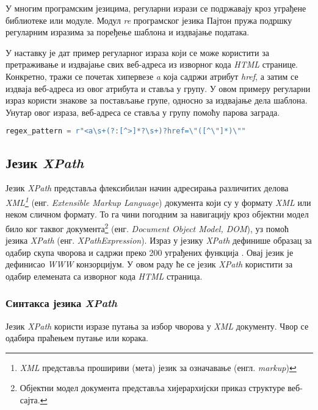\documentclass[12pt,oneside]{memoir}
\begin{document}
У многим програмским језицима, регуларни изрази се подржавају кроз уграђене библиотеке или модуле. Модул \textit{re} програмског језика Пајтон пружа подршку регуларним изразима за поређење шаблона и издвајање података.

У наставку је дат пример регуларног израза који се може користити за претраживање и издвајање свих веб-адреса из изворног кода \textit{HTML} странице. 
Конкретно, тражи се почетак хипервезе \textit{a} која садржи атрибут \textit{href}, а затим се издваја веб-адреса из овог атрибута и ставља у групу. У овом примеру регуларни израз користи знакове за постављање групе, односно за издвајање дела шаблона. Унутар овог израза, веб-адреса се ставља у групу помоћу парова заграда.
\begin{lstlisting}[language=Python]
regex_pattern = r"<a\s+(?:[^>]*?\s+)?href=\"([^\"]*)\""
\end{lstlisting}

\subsection{Језик \textit{XPath}}
Језик \textit{XPath} представља флексибилан начин адресирања различитих делова
\textit{XML\footnote{\textit{XML} представља прошириви (мета) језик за означавање (енгл. \textit{markup})}} (енг. \textit{Extensible Markup Language}) документа који су у формату \textit{XML} или неком сличном формату. То га чини погодним за навигацију кроз објектни модел било ког таквог документа\footnote{Објектни модел документа представља хијерархијски приказ структуре веб-сајта.} (енг. \textit{Document Object Model, DOM}), уз помоћ језика \textit{XPath} (енг. \textit{XPathExpression}). Израз у језику \textit{XPath} дефинише образац за одабир скупа чворова и садржи преко 200 уграђених функција \cite{xpath}. Овај језик је дефинисао \textit{WWW} конзорцијум. У овом раду ће се језик \textit{XPath} користити за одабир елемената са изворног кода \textit{HTML} страница.

\subsubsection{Синтакса језика \textit{XPath}}
Језик \textit{XPath} користи изразе путања за избор чворова у \textit{XML} документу. Чвор се одабира праћењем путање или корака. 
\end{document}
